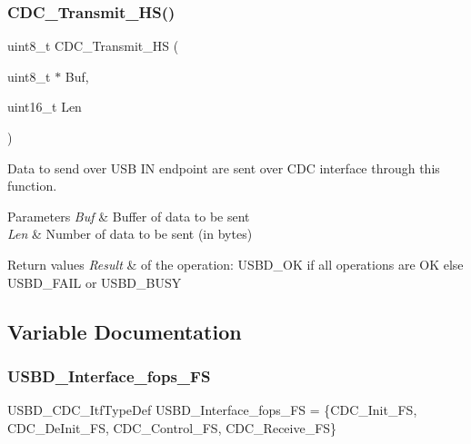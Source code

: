 \subsubsection{\texorpdfstring{C\+D\+C\+\_\+\+Transmit\+\_\+\+H\+S()}{CDC\_Transmit\_HS()}}
{\footnotesize\ttfamily uint8\+\_\+t C\+D\+C\+\_\+\+Transmit\+\_\+\+HS (\begin{DoxyParamCaption}\item[{uint8\+\_\+t $\ast$}]{Buf,  }\item[{uint16\+\_\+t}]{Len }\end{DoxyParamCaption})}



Data to send over U\+SB IN endpoint are sent over C\+DC interface through this function. 


\begin{DoxyParams}{Parameters}
{\em Buf} & Buffer of data to be sent \\
\hline
{\em Len} & Number of data to be sent (in bytes) \\
\hline
\end{DoxyParams}

\begin{DoxyRetVals}{Return values}
{\em Result} & of the operation\+: U\+S\+B\+D\+\_\+\+OK if all operations are OK else U\+S\+B\+D\+\_\+\+F\+A\+IL or U\+S\+B\+D\+\_\+\+B\+U\+SY \\
\hline
\end{DoxyRetVals}


\subsection{Variable Documentation}
\mbox{\label{group___u_s_b_d___c_d_c___i_f_ga99394ed19b774f171df96c2848c411ed}} 
\subsubsection{\texorpdfstring{U\+S\+B\+D\+\_\+\+Interface\+\_\+fops\+\_\+\+FS}{USBD\_Interface\_fops\_FS}}
{\footnotesize\ttfamily U\+S\+B\+D\+\_\+\+C\+D\+C\+\_\+\+Itf\+Type\+Def U\+S\+B\+D\+\_\+\+Interface\+\_\+fops\+\_\+\+FS = \{C\+D\+C\+\_\+\+Init\+\_\+\+FS, C\+D\+C\+\_\+\+De\+Init\+\_\+\+FS, C\+D\+C\+\_\+\+Control\+\_\+\+FS, C\+D\+C\+\_\+\+Receive\+\_\+\+FS\}}


